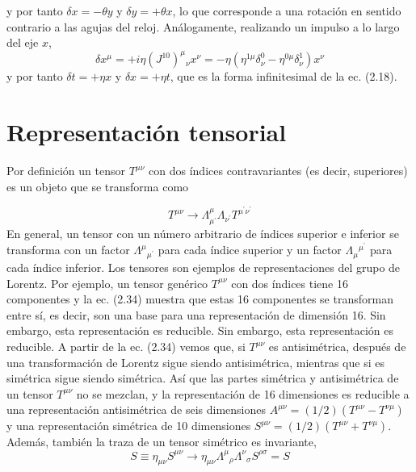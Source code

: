               y por tanto $\delta x=-\theta y$ y $\delta y=+\theta x$, lo que corresponde a una rotación en sentido contrario a las agujas del reloj. Análogamente, realizando un impulso a lo largo del eje $x$,
              \begin{equation*}
                \delta x^{\mu}=+i \eta\left(J^{10}\right)^{\mu}{ }_{\nu} x^{\nu}=-\eta\left(\eta^{1 \mu} \delta_{\nu}^{0}-\eta^{0 \mu} \delta_{\nu}^{1}\right) x^{\nu} \tag{2.33}
                  \end{equation*}
                  y por tanto $\delta t=+\eta x$ y $\delta x=+\eta t$, que es la forma infinitesimal de la ec. (2.18).
                  
                  \section{Representación tensorial}
                  
                  Por definición un tensor $T^{\mu \nu}$ con dos índices contravariantes (es decir, superiores) es un objeto que se transforma como

                  \begin{equation*}
                    T^{\mu \nu} \rightarrow \Lambda_{\mu^{\prime}}^{\mu} \Lambda_{\nu^{\prime}} T^{\mu^{\prime} \nu^{\prime}} \tag{2.34}
                    \end{equation*}
                    En general, un tensor con un número arbitrario de índices superior e inferior se transforma con un factor $\Lambda^{\mu}{ }_{\mu^{\prime}}$ para cada índice superior y un factor $\Lambda_{\mu}{ }^{\mu^{\prime}}$ para cada índice inferior. Los tensores son ejemplos de representaciones del grupo de Lorentz. Por ejemplo, un tensor genérico $T^{\mu \nu}$ con dos índices tiene 16 componentes y la ec. (2.34) muestra que estas 16 componentes se transforman entre sí, es decir, son una base para una representación de dimensión 16. Sin embargo, esta representación es reducible. Sin embargo, esta representación es reducible. A partir de la ec. (2.34) vemos que, si $T^{\mu \nu}$ es antisimétrica, después de una transformación de Lorentz sigue siendo antisimétrica, mientras que si es simétrica sigue siendo simétrica. Así que las partes simétrica y antisimétrica de un tensor $T^{\mu \nu}$ no se mezclan, y la representación de 16 dimensiones es reducible a una representación antisimétrica de seis dimensiones $A^{\mu \nu}=(1 / 2)\left(T^{\mu \nu}-T^{\nu \mu}\right)$ y una representación simétrica de 10 dimensiones $S^{\mu \nu}=(1 / 2)\left(T^{\mu \nu}+T^{\nu \mu}\right)$. Además, también la traza de un tensor simétrico es invariante,
                    \begin{equation*}
                      S \equiv \eta_{\mu \nu} S^{\mu \nu} \rightarrow \eta_{\mu \nu} \Lambda^{\mu}{ }_{\rho} \Lambda^{\nu}{ }_{\sigma} S^{\rho \sigma}=S \tag{2.35}
                      \end{equation*}


